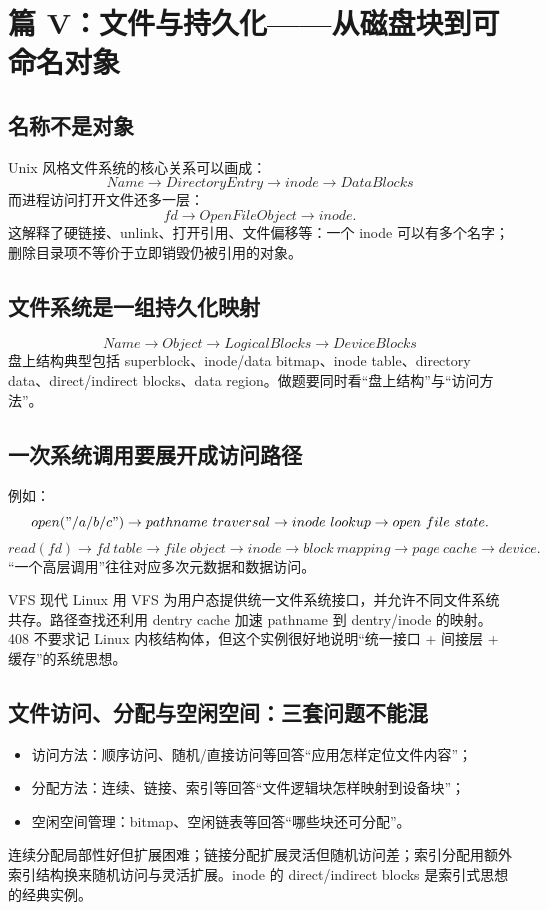 \documentclass[11pt,a4paper,openany]{ctexbook}
\begin{document}
\section{篇 V：文件与持久化——从磁盘块到可命名对象}

\subsection{名称不是对象}
Unix 风格文件系统的核心关系可以画成：
\[
\boxed{Name\rightarrow DirectoryEntry\rightarrow inode\rightarrow DataBlocks}
\]
而进程访问打开文件还多一层：
\[
fd\rightarrow OpenFileObject\rightarrow inode.
\]
这解释了硬链接、unlink、打开引用、文件偏移等：一个 inode 可以有多个名字；删除目录项不等价于立即销毁仍被引用的对象。

\subsection{文件系统是一组持久化映射}
\[
\boxed{Name\rightarrow Object\rightarrow LogicalBlocks\rightarrow DeviceBlocks}
\]
盘上结构典型包括 superblock、inode/data bitmap、inode table、directory data、direct/indirect blocks、data region。做题要同时看“盘上结构”与“访问方法”。

\subsection{一次系统调用要展开成访问路径}
例如：
\[
open("/a/b/c")\rightarrow pathname\ traversal\rightarrow inode\ lookup\rightarrow open\ file\ state.
\]
\[
read(fd)\rightarrow fd\ table\rightarrow file\ object\rightarrow inode\rightarrow block\ mapping\rightarrow page\ cache\rightarrow device.
\]
“一个高层调用”往往对应多次元数据和数据访问。

\begin{modernbox}{VFS}
现代 Linux 用 VFS 为用户态提供统一文件系统接口，并允许不同文件系统共存。路径查找还利用 dentry cache 加速 pathname 到 dentry/inode 的映射。408 不要求记 Linux 内核结构体，但这个实例很好地说明“统一接口 + 间接层 + 缓存”的系统思想。
\end{modernbox}


\subsection{文件访问、分配与空闲空间：三套问题不能混}
\begin{itemize}
  \item 访问方法：顺序访问、随机/直接访问等回答“应用怎样定位文件内容”；
  \item 分配方法：连续、链接、索引等回答“文件逻辑块怎样映射到设备块”；
  \item 空闲空间管理：bitmap、空闲链表等回答“哪些块还可分配”。
\end{itemize}
连续分配局部性好但扩展困难；链接分配扩展灵活但随机访问差；索引分配用额外索引结构换来随机访问与灵活扩展。inode 的 direct/indirect blocks 是索引式思想的经典实例。
\end{document}
